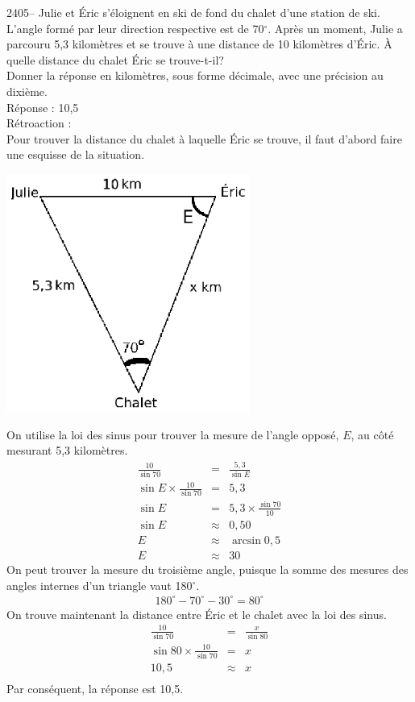 \documentclass[letterpaper, 12pt]{article}
\begin{document}
2405-- Julie et \'Eric s'\'eloignent en ski de fond du chalet d'une station de ski. L'angle form\'e par leur direction respective est de 70$^{\circ}$. Apr\`es un moment, Julie a parcouru 5,3 kilom\`etres et se trouve \`a une distance de 10 kilom\`etres d'\'Eric. \`A quelle distance du chalet \'Eric se trouve-t-il? \\
Donner la r\'eponse en kilom\`etres, sous forme d\'ecimale, avec une pr\'ecision au dixi\`eme.\\

R\'eponse : 10,5\\

R\'etroaction :\\
Pour trouver la distance du chalet \`a laquelle \'Eric se trouve, il faut d'abord faire une esquisse de la situation.
\begin{center}
 \includegraphics[width=8cm,bb=14 14 232 185]{Q2405.eps}
\end{center}
On utilise la loi des sinus pour trouver la mesure de l'angle oppos\'e, $E$, au c\^ot\'e mesurant 5,3 kilom\`etres.
\begin{eqnarray*}
 \frac{10}{\sin{70}}&=&\frac{5,3}{\sin{E}}\\[2mm]
 \sin{E}\times \frac{10}{\sin{70}}&=&5,3\\[2mm]
 \sin{E}&=&5,3\times \frac{\sin{70}}{10}\\[2mm]
 \sin{E}&\approx&0,50\\
 E&\approx&\arcsin{0,5}\\
 E&\approx&30
\end{eqnarray*}
On peut trouver la mesure du troisi\`eme angle, puisque la somme des mesures des angles internes d'un triangle vaut 180$^{\circ}$.
\begin{eqnarray*}
 180^{\circ}-70^{\circ}-30^{\circ}=80^{\circ}
\end{eqnarray*}
On trouve maintenant la distance entre \'Eric et le chalet avec la loi des sinus.
\begin{eqnarray*}
  \frac{10}{\sin{70}}&=&\frac{x}{\sin{80}}\\[2mm]
  \sin{80} \times \frac{10}{\sin{70}}&=&x\\[2mm]
  10,5 &\approx&x\\[2mm]
\end{eqnarray*}
Par cons\'equent, la r\'eponse est 10,5.\\
\end{document}
